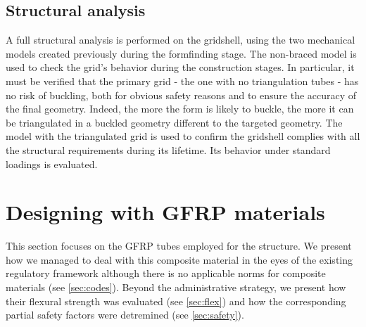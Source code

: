 \subsection{Structural analysis}
A full structural analysis is performed on the gridshell, using the two mechanical models created previously during the formfinding stage.
The non-braced model is used to check the grid’s behavior during the construction stages. In particular, it must be verified that the primary grid - the one with no triangulation tubes - has no risk of buckling, both for obvious safety reasons and to ensure the accuracy of the final geometry. Indeed, the more the form is likely to buckle, the more it can be triangulated in a buckled geometry different to the targeted geometry. The model with the triangulated grid is used to confirm the gridshell complies with all the structural requirements during its lifetime. Its behavior under standard loadings is evaluated.

\clearpage
\section{Designing with GFRP materials}
This section focuses on the GFRP tubes employed for the structure. We present how we managed to deal with this composite material in the eyes of the existing regulatory framework although there is no applicable norms for composite materials (see \cref{sec:codes}). Beyond the administrative strategy, we present how their flexural strength was evaluated (see \cref{sec:flex}) and how the corresponding partial safety factors were detremined (see \cref{sec:safety}).

